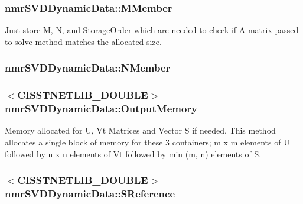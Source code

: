 \subsubsection[{M\+Member}]{ nmr\+S\+V\+D\+Dynamic\+Data\+::\+M\+Member\hspace{0.3cm}{\ttfamily [protected]}}\label{classnmr_s_v_d_dynamic_data_a80e8b2828a7f24b24a6633bf6caa3ad4}
Just store M, N, and Storage\+Order which are needed to check if A matrix passed to solve method matches the allocated size. \hypertarget{classnmr_s_v_d_dynamic_data_a4096b80ce5ddda1a17c49c4565bf33db}{}
\subsubsection[{N\+Member}]{ nmr\+S\+V\+D\+Dynamic\+Data\+::\+N\+Member\hspace{0.3cm}{\ttfamily [protected]}}\label{classnmr_s_v_d_dynamic_data_a4096b80ce5ddda1a17c49c4565bf33db}
\hypertarget{classnmr_s_v_d_dynamic_data_a62cf889a1182a098e665a73f4985a9ba}{}
\subsubsection[{Output\+Memory}]{$<$C\+I\+S\+S\+T\+N\+E\+T\+L\+I\+B\+\_\+\+D\+O\+U\+B\+L\+E$>$ nmr\+S\+V\+D\+Dynamic\+Data\+::\+Output\+Memory\hspace{0.3cm}{\ttfamily [protected]}}\label{classnmr_s_v_d_dynamic_data_a62cf889a1182a098e665a73f4985a9ba}
Memory allocated for U, Vt Matrices and Vector S if needed. This method allocates a single block of memory for these 3 containers; m x m elements of U followed by n x n elements of Vt followed by min (m, n) elements of S. \hypertarget{classnmr_s_v_d_dynamic_data_a695e21e7e405283b5f16b9285c31d5eb}{}
\subsubsection[{S\+Reference}]{$<$C\+I\+S\+S\+T\+N\+E\+T\+L\+I\+B\+\_\+\+D\+O\+U\+B\+L\+E$>$ nmr\+S\+V\+D\+Dynamic\+Data\+::\+S\+Reference\hspace{0.3cm}{\ttfamily [protected]}}\label{classnmr_s_v_d_dynamic_data_a695e21e7e405283b5f16b9285c31d5eb}
\hypertarget{classnmr_s_v_d_dynamic_data_ad8bf7fcd150c906b3f7407b5a91fa51b}{}
